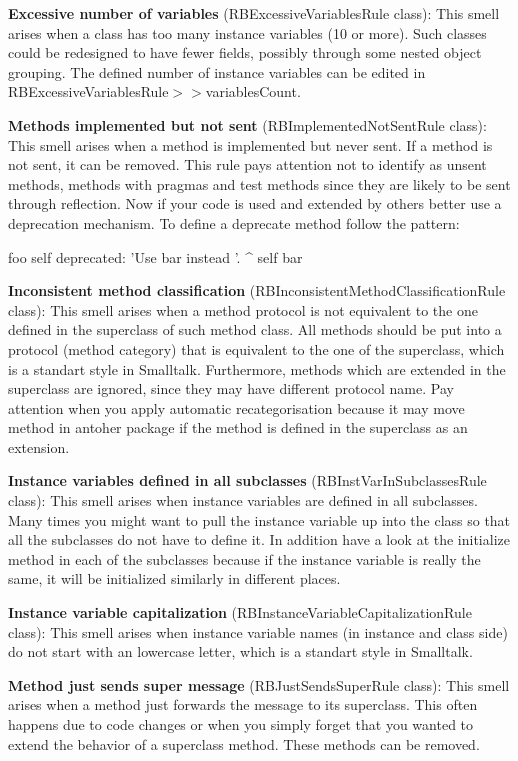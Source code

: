 \textbf{Excessive number of variables} (RBExcessiveVariablesRule class): This smell arises when a class has too many instance variables (10 or more). Such classes could be redesigned to have fewer fields, possibly through some nested object grouping. The defined number of instance variables can be edited in RBExcessiveVariablesRule$>>$variablesCount.

\textbf{Methods implemented but not sent} (RBImplementedNotSentRule class): This smell arises when a method is implemented but never sent. If a method is not sent, it can be removed. This rule pays attention not to identify as unsent methods, methods with pragmas and test methods since they are likely to be sent through reflection.
	Now if your code is used and extended by others better use a deprecation mechanism. To define a deprecate method follow the pattern: 
	
	foo
		self deprecated: 'Use bar instead '. 
		^ self bar
		 

\textbf{Inconsistent method classification} (RBInconsistentMethodClassificationRule class): This smell arises when a method protocol is not equivalent to the one defined in the superclass of such method class. All methods should be put into a protocol (method category) that is equivalent to the one of the superclass, which is a standart style in Smalltalk. Furthermore, methods which are extended in the superclass are ignored, since they may have different protocol name. Pay attention when you apply automatic recategorisation because it may move method in antoher package if the method is defined in the superclass as an extension.

\textbf{Instance variables defined in all subclasses} (RBInstVarInSubclassesRule class): This smell arises when instance variables are defined in all subclasses. Many times you might want to pull the instance variable up into the class so that all the subclasses do not have to define it. In addition have a look at the initialize method in each of the subclasses because if the instance variable is really the same, it will be initialized similarly in different places.

\textbf{Instance variable capitalization} (RBInstanceVariableCapitalizationRule class): This smell arises when instance variable names (in instance and class side) do not start with an lowercase letter, which is a standart style in Smalltalk.

\textbf{Method just sends super message} (RBJustSendsSuperRule class): This smell arises when a method just forwards the message to its superclass. This often happens due to code changes or when you simply forget that you wanted to extend the behavior of a superclass method. These methods can be removed.

